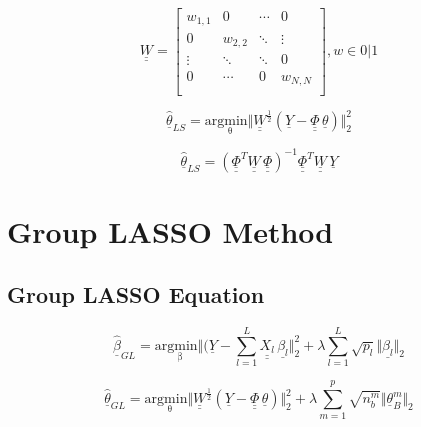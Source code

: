  \begin{equation}
			\underline{\underline{W}}  =  \begin{bmatrix}
		w_{1,1} & 0 & \cdots & 0 \\
		0 & w_{2,2} & \ddots & \vdots \\
		\vdots & \ddots & \ddots & 0 \\
		0 & \cdots & 0 & w_{N,N} \\
				\end{bmatrix},
				w \in {0|1}
	\label{eq:weightmatrix}
\end{equation}



 \begin{equation}
			\hat{\underline{\theta}}_{LS} = \mathrm{arg \underset{\theta} min} \Vert \underline{\underline{W}}^{\frac{1}{2}}(\underline{Y}-\underline{\underline{\Phi}} \, \underline{\theta}) \Vert^2_2 	
	\label{eq:w_LS_intro}
\end{equation}

 \begin{equation}
	\hat{\underline{\theta}}_{LS} = (\underline{\underline{\Phi}}^T\underline{\underline{W}} \, \underline{\underline{\Phi}})^{-1}\underline{\underline{\Phi}}^T \underline{\underline{W}} \, \underline{Y}
	\label{eq:solution_w_LS}
\end{equation}



\section{Group LASSO Method}
\label{sec:Group_LASSO}



\subsection{Group LASSO Equation}
\label{sec:GroupLassoEq}



 \begin{equation}
	\hat{\underline{\beta}}_{GL} = \mathrm{arg \underset{\beta} min} \Vert  (\underline{Y} - \sum_{l=1}^L \underline{\underline{X_l}} \, \underline{\beta_l} \Vert^2_2 + \lambda \sum_{l=1}^L \sqrt{p_l} \Vert \underline{\beta_l} \Vert_2
	\label{eq:grouplasso_original}
\end{equation}



 \begin{equation}
	\hat{\underline{\theta}}_{GL} = \mathrm{arg \underset{\theta} min} \Vert \underline{\underline{W}}^{\frac{1}{2}} (\underline{Y}-\underline{\underline{\Phi}} \, \underline{\theta}) \Vert^2_2 + \lambda \sum_{m=1}^p \sqrt{n^m_b} \Vert \underline{\theta}^m_B \Vert_2
	\label{eq:grouplasso}
\end{equation}

